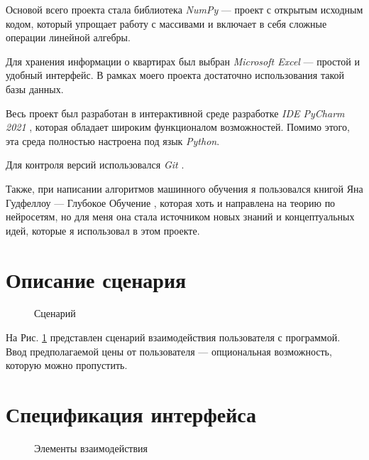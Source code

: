 \documentclass{article}
\begin{document}
		Основой всего проекта стала библиотека \textit{NumPy} \cite{litlink3} --- проект с открытым исходным кодом, который упрощает работу с массивами и включает в себя сложные операции линейной алгебры. 
		
		Для хранения информации о квартирах был выбран \textit{Microsoft Excel} \cite{litlink4} --- простой и удобный интерфейс. В рамках моего проекта достаточно использования такой базы данных.
		
		Весь проект был разработан в интерактивной среде разработке \textit{IDE PyCharm 2021} \cite{litlink5}, которая обладает широким функционалом возможностей. Помимо этого, эта среда полностью настроена под язык \textit{Python}.
		
		Для контроля версий использовался \textit{Git} \cite{litlink6}.
		
		Также, при написании алгоритмов машинного обучения я пользовался книгой Яна Гудфеллоу --- Глубокое Обучение \cite{litlink7}, которая хоть и направлена на теорию по нейросетям, но для меня она стала источником новых знаний и концептуальных идей, которые я использовал в этом проекте.

	\newpage
	\section {Описание сценария}
	
		\begin{figure}[H]
			\centering
			\caption{Сценарий}
			\label{fig:scenery_description}
		\end{figure}
	
		На Рис. \ref{fig:scenery_description} представлен сценарий взаимодействия пользователя с программой. Ввод предполагаемой цены от пользователя --- опциональная возможность, которую можно пропустить.
		
	\newpage
	\section {Спецификация интерфейса}

		\begin{figure}[H]
			\centering
			\hfill %
			\caption{Элементы взаимодействия}
			\label{fig:start_element}
		\end{figure}
	
\end{document}

